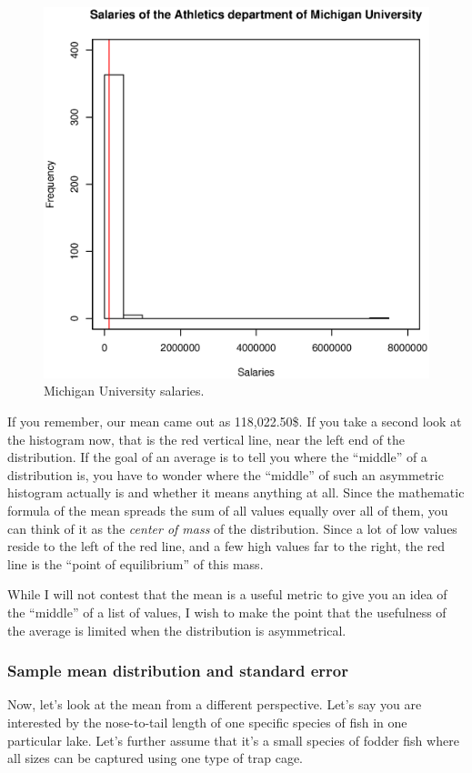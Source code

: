 \documentclass{report}
\begin{document}
		\begin{figure}[h]
			\centering
			\includegraphics[width=1.0\textwidth]{salaries.eps}
			\caption{Michigan University salaries.}
			\label{fig:ums}
		\end{figure}
		
		If you remember, our mean came out as 118,022.50\$. If you take a second look at the histogram now, that is the red vertical line, near the left end of the distribution. If the goal of an average is to tell you where the ``middle'' of a distribution is, you have to wonder where the ``middle'' of such an asymmetric histogram actually is and whether it means anything at all. Since the mathematic formula of the mean spreads the sum of all values equally over all of them, you can think of it as the \emph{center of mass} of the distribution. Since a lot of low values reside to the left of the red line, and a few high values far to the right, the red line is the ``point of equilibrium'' of this mass.
		
		While I will not contest that the mean is a useful metric to give you an idea of the ``middle'' of a list of values, I wish to make the point that the usefulness of the average is limited when the distribution is asymmetrical.
		
			\subsubsection{Sample mean distribution and standard error}\label{subsubsec:se}
			Now, let's look at the mean from a different perspective. Let's say you are interested by the nose-to-tail length of one specific species of fish in one particular lake. Let's further assume that it's a small species of fodder fish where all sizes can be captured using one type of trap cage.
			
\end{document}
